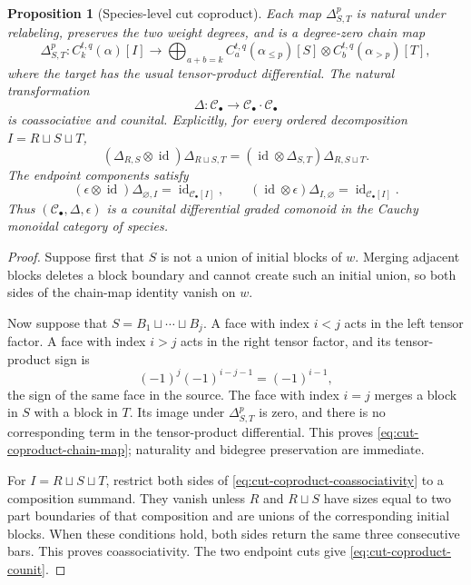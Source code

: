 \documentclass{amsart}
\newtheorem{proposition}[proposition]{Proposition}
\theoremstyle{definition}
\theoremstyle{remark}
\newcommand{\id}{\operatorname{id}}
\begin{document}
\begin{proposition}[Species-level cut coproduct]
\label{prop:cut-coproduct}
Each map $\Delta^p_{S,T}$ is natural under relabeling, preserves the two weight
degrees, and is a degree-zero chain map
\begin{equation}
 \Delta^p_{S,T}:C_k^{t,q}(\alpha)[I]
 \longrightarrow
 \bigoplus_{a+b=k}
 C_a^{t,q}(\alpha_{\leq p})[S]\otimes
 C_b^{t,q}(\alpha_{>p})[T],
 \label{eq:cut-coproduct-chain-map}
\end{equation}
where the target has the usual tensor-product differential.  The natural
transformation
\[
 \Delta:\mathcal C_\bullet\longrightarrow
 \mathcal C_\bullet\mathbin{\cdot}\mathcal C_\bullet
\]
is coassociative and counital.  Explicitly, for every ordered decomposition
$I=R\sqcup S\sqcup T$,
\begin{equation}
 (\Delta_{R,S}\otimes\id)\Delta_{R\sqcup S,T}
 =(\id\otimes\Delta_{S,T})\Delta_{R,S\sqcup T}.
 \label{eq:cut-coproduct-coassociativity}
\end{equation}
The endpoint components satisfy
\begin{equation}
 (\epsilon\otimes\id)\Delta_{\varnothing,I}=\id_{\mathcal C_\bullet[I]},
 \qquad
 (\id\otimes\epsilon)\Delta_{I,\varnothing}=\id_{\mathcal C_\bullet[I]}.
 \label{eq:cut-coproduct-counit}
\end{equation}
Thus $(\mathcal C_\bullet,\Delta,\epsilon)$ is a counital differential graded
comonoid in the Cauchy monoidal category of species.
\end{proposition}

\begin{proof}
Suppose first that $S$ is not a union of initial blocks of $w$.  Merging
adjacent blocks deletes a block boundary and cannot create such an initial
union, so both sides of the chain-map identity vanish on $w$.

Now suppose that $S=B_1\sqcup\cdots\sqcup B_j$.  A face with index $i<j$
acts in the left tensor factor.  A face with index $i>j$ acts in the right
tensor factor, and its tensor-product sign is
\[
 (-1)^j(-1)^{i-j-1}=(-1)^{i-1},
\]
the sign of the same face in the source.  The face with index $i=j$ merges a
block in $S$ with a block in $T$.  Its image under $\Delta^p_{S,T}$ is zero,
and there is no corresponding term in the tensor-product differential.  This
proves \eqref{eq:cut-coproduct-chain-map}; naturality and bidegree preservation
are immediate.

For $I=R\sqcup S\sqcup T$, restrict both sides of
\eqref{eq:cut-coproduct-coassociativity} to a composition summand.  They vanish
unless $R$ and $R\sqcup S$ have sizes equal to two part boundaries of that
composition and are unions of the corresponding initial blocks.  When these
conditions hold, both sides return the same three consecutive bars.  This
proves coassociativity.  The two endpoint cuts give
\eqref{eq:cut-coproduct-counit}.
\end{proof}
\end{document}
